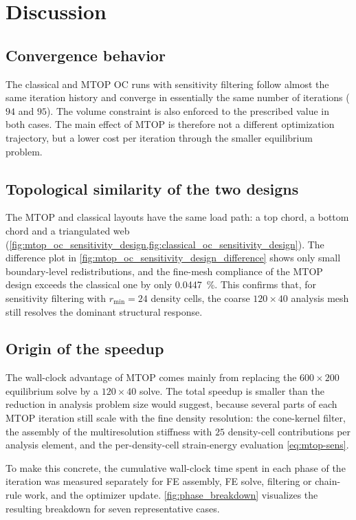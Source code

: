 \documentclass[11pt,a4paper]{article}
\begin{document}
\section{Discussion}

\subsection{Convergence behavior}

The classical and MTOP OC runs with sensitivity filtering follow almost the same iteration history and converge in essentially the same number of iterations ($94$ and $95$). The volume constraint is also enforced to the prescribed value in both cases. The main effect of MTOP is therefore not a different optimization trajectory, but a lower cost per iteration through the smaller equilibrium problem.

\subsection{Topological similarity of the two designs}

The MTOP and classical layouts have the same load path: a top chord, a bottom chord and a triangulated web (\cref{fig:mtop_oc_sensitivity_design,fig:classical_oc_sensitivity_design}). The difference plot in \cref{fig:mtop_oc_sensitivity_design_difference} shows only small boundary-level redistributions, and the fine-mesh compliance of the MTOP design exceeds the classical one by only \SI{0.0447}{\percent}. This confirms that, for sensitivity filtering with $r_{\min}=24$ density cells, the coarse $120\times 40$ analysis mesh still resolves the dominant structural response.

\subsection{Origin of the speedup}\label{sec:speedup-origin}

The wall-clock advantage of MTOP comes mainly from replacing the $600\times 200$ equilibrium solve by a $120\times 40$ solve. The total speedup is smaller than the reduction in analysis problem size would suggest, because several parts of each MTOP iteration still scale with the fine density resolution: the cone-kernel filter, the assembly of the multiresolution stiffness with $25$ density-cell contributions per analysis element, and the per-density-cell strain-energy evaluation \cref{eq:mtop-sens}.

To make this concrete, the cumulative wall-clock time spent in each phase of the iteration was measured separately for FE assembly, FE solve, filtering or chain-rule work, and the optimizer update. \cref{fig:phase_breakdown} visualizes the resulting breakdown for seven representative cases.
\end{document}

